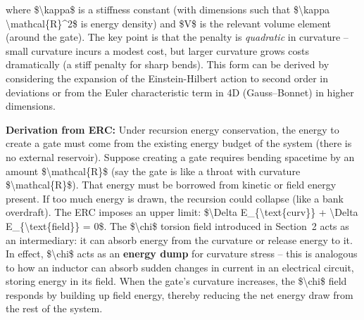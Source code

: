 \documentclass[]{article}
\begin{document}
where \$\textbackslash{}kappa\$ is a stiffness constant (with dimensions
such that \$\textbackslash{}kappa \textbackslash{}mathcal\{R\}\^{}2\$ is
energy density) and \$V\$ is the relevant volume element (around the
gate). The key point is that the penalty is \emph{quadratic} in
curvature -- small curvature incurs a modest cost, but larger curvature
grows costs dramatically (a stiff penalty for sharp bends). This form
can be derived by considering the expansion of the Einstein-Hilbert
action to second order in deviations or from the Euler characteristic
term in 4D (Gauss--Bonnet) in higher dimensions.

\textbf{Derivation from ERC:} Under recursion energy conservation, the
energy to create a gate must come from the existing energy budget of the
system (there is no external reservoir). Suppose creating a gate
requires bending spacetime by an amount \$\textbackslash{}mathcal\{R\}\$
(say the gate is like a throat with curvature
\$\textbackslash{}mathcal\{R\}\$). That energy must be borrowed from
kinetic or field energy present. If too much energy is drawn, the
recursion could collapse (like a bank overdraft). The ERC imposes an
upper limit: \$\textbackslash{}Delta E\_\{\textbackslash{}text\{curv\}\}
+ \textbackslash{}Delta E\_\{\textbackslash{}text\{field\}\} = 0\$. The
\$\textbackslash{}chi\$ torsion field introduced in Section~2 acts as an
intermediary: it can absorb energy from the curvature or release energy
to it. In effect, \$\textbackslash{}chi\$ acts as an \textbf{energy
dump} for curvature stress -- this is analogous to how an inductor can
absorb sudden changes in current in an electrical circuit, storing
energy in its field. When the gate's curvature increases, the
\$\textbackslash{}chi\$ field responds by building up field energy,
thereby reducing the net energy draw from the rest of the system.
\end{document}
